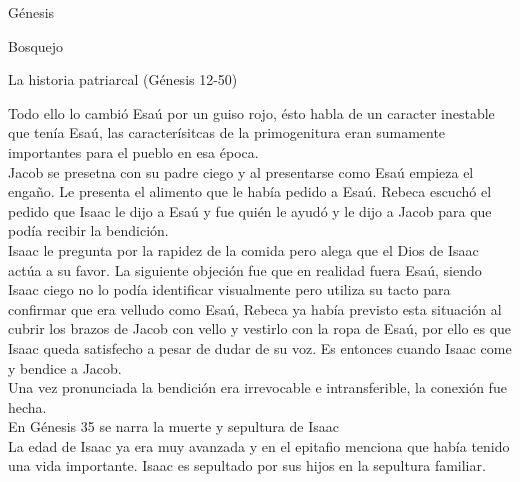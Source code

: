 \begin{section}{Génesis}
\begin{subsection}{Bosquejo}
\begin{subsubsection}{La historia patriarcal (Génesis 12-50)}
\begin{enumerate}
	Todo ello lo cambió Esaú por un guiso rojo, ésto habla de un caracter inestable que tenía Esaú, las caracterísitcas de la primogenitura eran sumamente importantes para el pueblo en esa época.\\
	Jacob se presetna con su padre ciego y al presentarse como Esaú empieza el engaño. Le presenta el alimento que le había pedido a Esaú. Rebeca escuchó el pedido que Isaac le dijo a Esaú y fue quién le ayudó y le dijo a Jacob para que podía recibir la bendición.\\
	Isaac le pregunta por la rapidez de la comida pero alega que el Dios de Isaac actúa a su favor. La siguiente objeción fue que en realidad fuera Esaú, siendo Isaac ciego no lo podía identificar visualmente  pero utiliza su tacto para confirmar que era velludo como Esaú, Rebeca ya había previsto esta situación al cubrir los brazos de Jacob con vello y vestirlo con la ropa de Esaú, por ello es que Isaac queda satisfecho a pesar de dudar de su voz. Es entonces cuando Isaac come y bendice a Jacob.\\
	Una vez pronunciada la bendición era irrevocable e intransferible, la conexión fue hecha.\\
	En Génesis 35 se narra la muerte y sepultura de Isaac\\
	La edad de Isaac ya era muy avanzada y en el epitafio menciona que había tenido una vida importante. Isaac es sepultado por sus hijos en la sepultura familiar.


\end{enumerate}
\end{subsubsection}
\end{subsection}
\end{section}
